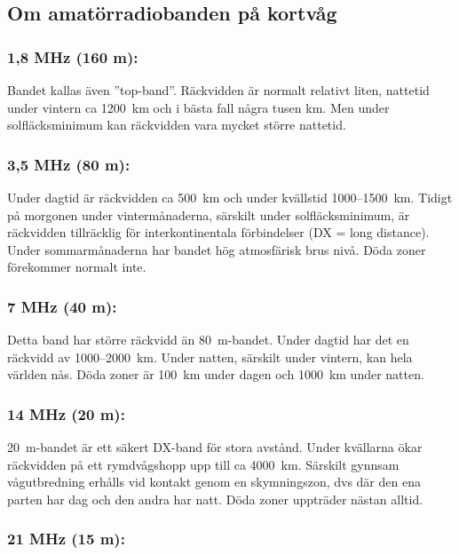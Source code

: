 \subsection{Om amatörradiobanden på kortvåg}

\subsubsection{1,8 MHz (160 m):}

Bandet kallas även ''top-band''. Räckvidden är normalt relativt liten,
nattetid under vintern ca 1200~km och i bästa fall några tusen km.
Men under solfläcksminimum kan räckvidden vara mycket större nattetid.

\subsubsection{3,5 MHz (80 m):}

Under dagtid är räckvidden ca 500~km och under kvällstid 1000--1500~km.
Tidigt på morgonen under vintermånaderna, särskilt under
solfläcksminimum, är räckvidden tillräcklig för interkontinentala
förbindelser (DX = long distance). Under sommarmånaderna har bandet
hög atmosfärisk brus nivå. Döda zoner förekommer normalt inte.

\subsubsection{7 MHz (40 m):}

Detta band har större räckvidd än 80~m-bandet. Under dagtid har det en
räckvidd av 1000--2000~km. Under natten, särskilt under vintern, kan
hela världen nås. Döda zoner är 100~km under dagen och 1000~km under
natten.

\subsubsection{14 MHz (20 m):}

20~m-bandet är ett säkert DX-band för stora avstånd.
Under kvällarna ökar räckvidden på ett rymdvågshopp upp till ca 4000~km.
Särskilt gynnsam vågutbredning erhålls vid kontakt genom en skymningszon, dvs
där den ena parten har dag och den andra har natt.
Döda zoner uppträder nästan alltid.

\subsubsection{21 MHz (15 m):}

